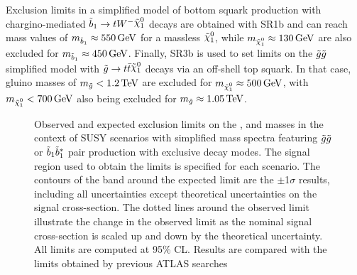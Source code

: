Exclusion limits in a simplified model of bottom squark production with chargino-mediated $\sbottomone\to tW^-\ninoone$ decays are 
obtained with SR1b and can reach mass values of $m_{\tilde{b}_1}\approx\SI{550}{GeV}$ for a massless $\ninoone$, while $m_{\ninoone}\approx\SI{130}{GeV}$ are also excluded for $m_{\tilde{b}_1}\approx\SI{450}{GeV}$. Finally, SR3b is used to set limits on the $\tilde{g}\tilde{g}$ simplified model with $\gluino\to t\bar t\ninoone$ decays via an off-shell top squark. 
In that case, gluino masses of $m_{\tilde{g}}<\SI{1.2}{TeV}$ are excluded for $m_{\ninoone}\approx\SI{500}{GeV}$, 
with $m_{\ninoone}<\SI{700}{GeV}$ also being excluded for $m_{\tilde{g}}\approx\SI{1.05}{TeV}$.

\begin{figure}[t!]
\centering
{}

\caption{Observed and expected exclusion limits on the \gluino, \sbottomone and \ninoone masses 
in the context of SUSY scenarios with simplified mass spectra 
featuring $\tilde{g}\tilde{g}$ or $\tilde{b}_1 \tilde{b}_{1}^{*}$ pair production with exclusive decay modes. 
The signal region used to obtain the limits is specified for each scenario. 
The contours of the band around the expected limit are the $\pm$1$\sigma$ results, 
  including all uncertainties except theoretical uncertainties on the signal cross-section. The dotted lines around the observed
    limit illustrate the change in the observed limit as the nominal signal cross-section is scaled up and down
    by the theoretical uncertainty. All limits are computed at 95\% CL.
Results are compared with the limits obtained by previous ATLAS searches
}
\label{fig:histfitter_final}
\end{figure}


